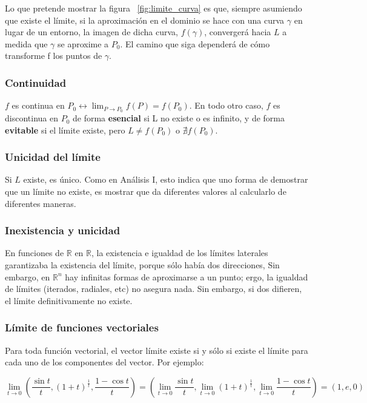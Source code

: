 \documentclass{article}
\renewcommand{\Bbb}{\mathbb}
\begin{document}
Lo que pretende mostrar la figura ~\ref{fig:limite_curva} es que, siempre asumiendo que existe el límite, si la aproximación en el dominio se hace con una curva $\gamma$ en lugar de un entorno, la imagen de dicha curva, $f(\gamma)$, convergerá hacia $L$ a medida que $\gamma$ se aproxime a $P_0$. El camino que siga dependerá de cómo transforme f los puntos de $\gamma$.

\subsubsection{Continuidad}

$f$ es continua en $P_0 \longleftrightarrow \displaystyle{\lim_{P \rightarrow P_0}} f(P) = f(P_0)$. En todo otro caso, $f$ es discontinua en $P_0$ de forma \textbf{esencial} si L no existe o es infinito, y de forma \textbf{evitable} si el límite existe, pero $L \neq f(P_0)$ o $\nexists f(P_0)$.

\subsubsection{Unicidad del límite}

Si $L$ existe, es único. Como en Análisis I, esto indica que uno forma de demostrar que un límite no existe, es mostrar que da diferentes valores al calcularlo de diferentes maneras.

\subsubsection{Inexistencia y unicidad}

En funciones de $\Bbb R$ en $\Bbb R$, la existencia e igualdad de los límites laterales garantizaba la existencia del límite, porque sólo había dos direcciones, Sin embargo, en $\Bbb R^n$ hay infinitas formas de aproximarse a un punto; ergo, la igualdad de límites (iterados, radiales, etc) no asegura nada. Sin embargo, si dos difieren, el límite definitivamente no existe.

\subsubsection{Límite de funciones vectoriales}

Para toda función vectorial, el vector límite existe si y sólo si existe el límite para cada uno de los componentes del vector. Por ejemplo:

\begin{equation}
\lim_{t \rightarrow 0} \left( \frac{\sin t}{t}, (1 + t)^\frac{1}{t}, \frac{1-\cos t}{t} \right) = \left( \lim_{t \rightarrow 0} \frac{\sin t}{t}, \lim_{t \rightarrow 0} (1 + t)^\frac{1}{t}, \lim_{t \rightarrow 0} \frac{1-\cos t}{t} \right) = (1, e, 0)
\end{equation}
\end{document}
